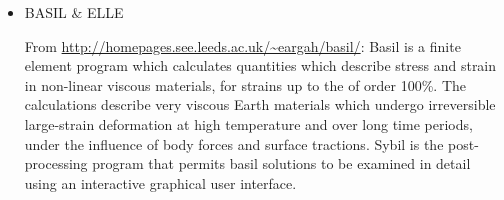 \begin{itemize}
\begin{scriptsize}
\begin{itemize}
                               \textcite{sacp21}, \textcite{grrm21},
                               \textcite{hebg21}, \textcite{njsn21}, 
                               \textcite{clhe21}, \textcite{fabh21},
                               \textcite{nebg21}, \textcite{cosb21},
                               \textcite{gona21}, \textcite{sabg21},
                               \textcite{hoco21}, \textcite{frbi21},
                               \textcite{manp21}, \textcite{segp21},
                               \textcite{ribr21}, \textcite{damg21}
\item[\twothousandtwentytwo]   \textcite{thba22}, \textcite{pafl22}, \textcite{behb22},
                               \textcite{onau22}, \textcite{zhlz22}, \textcite{nebg22},
                               \textcite{nebw22}, \textcite{ludn22}, \textcite{heco22},
                               \textcite{bahf22}, \textcite{liya22}, \textcite{wecn22},
                               \textcite{clkl22}, \textcite{baha22}, \textcite{holt22},
                               \textcite{liki22}, \textcite{panb22}, \textcite{xihz22},
                               \textcite{less22}, \textcite{hebe22}, \textcite{mabc22},
                               \textcite{dagl22}
\item[\twothousandtwentythree] \textcite{hepm23}, \textcite{hoal23}, \textcite{wenc23},
                               \textcite{gusw23}, \textcite{zhzw23}, \textcite{lild23},
                               \textcite{scbg23}, \textcite{lafn23}, \textcite{modg23},
                               \textcite{phnm23}, \textcite{heka23}, \textcite{bogb23},
                               \textcite{ligr23}, \textcite{lipy23}, \textcite{hegs23},
                               \textcite{bogb23}, \textcite{pors23}, \textcite{liyq23},
                               \textcite{sacr23} 
\end{itemize}
\end{scriptsize}

\item {\codefont BASIL \& ELLE} 

From \url{http://homepages.see.leeds.ac.uk/~eargah/basil/}:
Basil is a finite element program which calculates quantities which describe  stress  and strain in non-linear viscous materials, for strains up to the of order 100\%.   
The calculations  describe  very  viscous  Earth materials which undergo irreversible large-strain 
deformation at  high  temperature  and over long time periods, under the influence of body 
forces and surface tractions.  Sybil  is the post-processing program that permits basil 
solutions to be examined in detail using an interactive graphical user interface.


\end{itemize}
